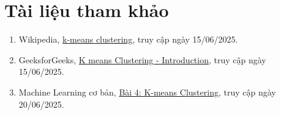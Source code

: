 \section{Tài liệu tham khảo}

\begin{enumerate}
  \item Wikipedia, \href{https://en.wikipedia.org/wiki/k-means_clustering}{k-means clustering}, truy cập ngày 15/06/2025.
  \item GeeksforGeeks, \href{https://www.geeksforgeeks.org/machine-learning/k-means-clustering-introduction/}{K means Clustering - Introduction}, truy cập ngày 15/06/2025.
  \item Machine Learning cơ bản, \href{https://machinelearningcoban.com/2017/01/01/kmeans/}{Bài 4: K-means Clustering}, truy cập ngày 20/06/2025.
\end{enumerate}
